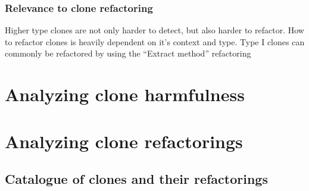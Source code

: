 \documentclass{report}
\theoremstyle{definition}
\theoremstyle{remark}
\begin{document}
\subsection{Relevance to clone refactoring}
Higher type clones are not only harder to detect, but also harder to refactor. How to refactor clones is heavily dependent on it's context and type. Type I clones can commonly be refactored by using the ``Extract method'' refactoring

\chapter{Analyzing clone harmfulness}


\chapter{Analyzing clone refactorings}


\section{Catalogue of clones and their refactorings}



\newpage


\end{document}

